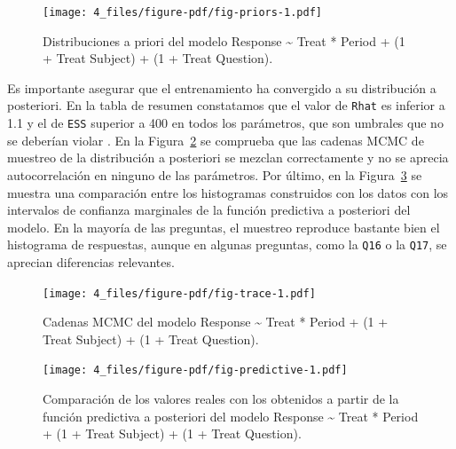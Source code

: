 \documentclass[
  12pt,
  a4paper,
  extrafontsizes,
  onecolumn,
  openright,
  table]{memoir}
\begin{document}
\normalsize

\begin{figure}[h]

{\centering \texttt{[image: 4\_files/figure-pdf/fig-priors-1.pdf]}

}

\caption[Distribuciones a priori del modelo
seleccionado.]{\label{fig-priors}Distribuciones a priori del modelo
Response \textasciitilde{} Treat * Period + (1 + Treat \textbar{}
Subject) + (1 + Treat \textbar{} Question).}

\end{figure}

Es importante asegurar que el entrenamiento ha convergido a su
distribución a posteriori. En la tabla de resumen constatamos que el
valor de \texttt{Rhat} es inferior a 1.1 y el de \texttt{ESS} superior a
400 en todos los parámetros, que son umbrales que no se deberían violar
\autocite[ver][]{burkner2019}. En la Figura~\ref{fig-trace} se comprueba
que las cadenas MCMC de muestreo de la distribución a posteriori se
mezclan correctamente y no se aprecia autocorrelación en ninguno de las
parámetros. Por último, en la Figura~\ref{fig-predictive} se muestra una
comparación entre los histogramas construidos con los datos con los
intervalos de confianza marginales de la función predictiva a posteriori
del modelo. En la mayoría de las preguntas, el muestreo reproduce
bastante bien el histograma de respuestas, aunque en algunas preguntas,
como la \texttt{Q16} o la \texttt{Q17}, se aprecian diferencias
relevantes.

\begin{figure}[h]

{\centering \texttt{[image: 4\_files/figure-pdf/fig-trace-1.pdf]}

}

\caption[Cadenas MCMC del modelo seleccionado.]{\label{fig-trace}Cadenas
MCMC del modelo Response \textasciitilde{} Treat * Period + (1 + Treat
\textbar{} Subject) + (1 + Treat \textbar{} Question).}

\end{figure}

\begin{figure}[h]

{\centering \texttt{[image: 4\_files/figure-pdf/fig-predictive-1.pdf]}

}

\caption[Verificación usando la función predictiva a posteriori del
modelo seleccionado.]{\label{fig-predictive}Comparación de los valores
reales con los obtenidos a partir de la función predictiva a posteriori
del modelo Response \textasciitilde{} Treat * Period + (1 + Treat
\textbar{} Subject) + (1 + Treat \textbar{} Question).}

\end{figure}
\end{document}
